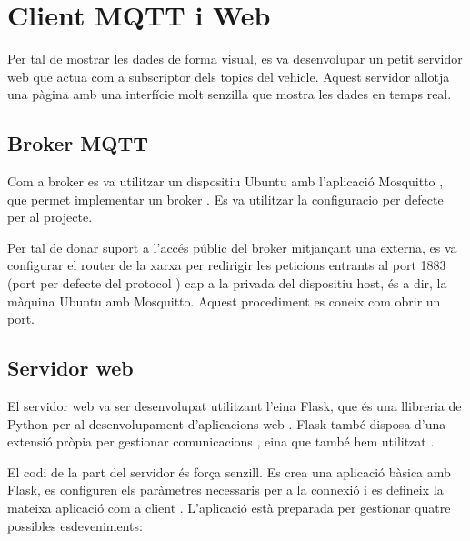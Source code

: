 \documentclass{tfgitic}[2024/07/01]
\begin{document}
\section{Client MQTT i Web}

Per tal de mostrar les dades de forma visual, es va desenvolupar un petit servidor web que actua com a subscriptor dels topics  del vehicle. 
Aquest servidor allotja una pàgina amb una interfície molt senzilla que mostra les dades en temps real.

\subsection{Broker MQTT}

Com a broker  es va utilitzar un dispositiu Ubuntu amb l’aplicació Mosquitto \cite{mosquitto}, que permet implementar un broker . Es va utilitzar la configuracio
per defecte per al projecte.

Per tal de donar suport a l'accés públic del broker mitjançant una  externa, es va configurar el router de la xarxa per redirigir les peticions entrants al port 1883 (port per defecte 
del protocol ) cap a la  privada del dispositiu host, és a dir, la màquina Ubuntu amb Mosquitto. Aquest procediment es coneix com obrir un port.

\subsection{Servidor web}

El servidor web va ser desenvolupat utilitzant l'eina Flask, que és una llibreria de Python per al desenvolupament d'aplicacions web \cite{flask_docs}. 
Flask també disposa d'una extensió pròpia per gestionar comunicacions , eina que també hem utilitzat \cite{flask_mqtt_docs}.

El codi de la part del servidor és força senzill. Es crea una aplicació bàsica amb Flask, es configuren els paràmetres necessaris per a la connexió  
i es defineix la mateixa aplicació com a client . L'aplicació està preparada per gestionar quatre possibles esdeveniments:
\end{document}
